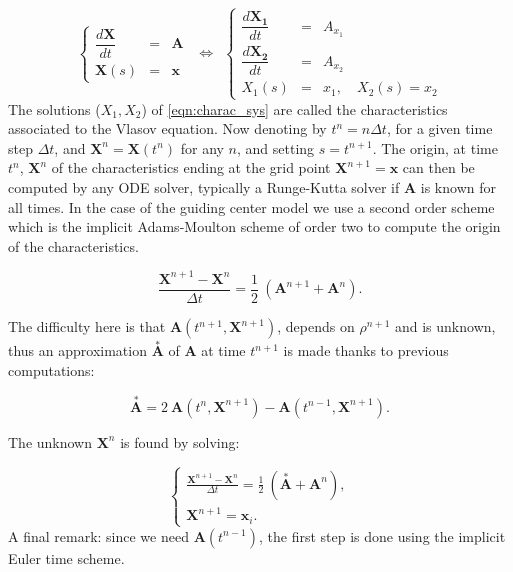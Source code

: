 \documentclass[proc]{edpsmath}
\begin{document}
\begin{equation}
	\label{eqn:charac_sys}
	\left\lbrace
	\begin{array}{lcl}
	\displaystyle \dfrac{d \mathbf{X}}{dt} &=& \mathbf{A}\\[0.3cm]
	\displaystyle \mathbf{X}(s) &=& \mathbf{x}
	\end{array}\right.
~~\Longleftrightarrow ~~
	\left\lbrace
	\begin{array}{lcl}
	\displaystyle \dfrac{d \mathbf{X_1}}{dt} &=& A_{x_1}\\[0.3cm]
	\displaystyle \dfrac{d \mathbf{X_2}}{dt} &=& A_{x_2}\\[0.3cm]
	\displaystyle X_1(s) &=& x_1, \quad   X_2(s) = x_2
	\end{array}\right.
\end{equation}
The solutions ($X_1, X_2$) of \eqref{eqn:charac_sys} are called the characteristics associated to the Vlasov equation. 
Now denoting by $t^n=n\Delta t$, for a given time step $\Delta t$, and $\mathbf{X}^n= \mathbf{X}(t^n)$ for any $n$, and setting $s=t^{n+1}$. The origin, at time $t^n$, $ \mathbf{X}^n$ of the characteristics ending at the grid point $ \mathbf{X}^{n+1}= \mathbf{x}$ can then be computed by any ODE solver, typically a Runge-Kutta solver if  $ \mathbf{A}$ is known for all times. In the case of the guiding  center model we use a second order scheme which is the implicit Adams-Moulton scheme of order two to compute the origin of the characteristics.

 \begin{equation*}
 	 \displaystyle{ \frac{\textbf{X}^{n+1}-\textbf{X}^{n}}{ \Delta t } =\frac{1}{2} ~( \textbf{A}^{n+1}+\textbf{A}^{n} ) }.
 \end{equation*} 
 
\noindent The difficulty here is that  $\textbf{A}(t^{n+1},\textbf{X}^{n+1})$, depends on $\rho^{n+1}$ and is unknown, thus an approximation $\overset{*}{\textbf{A}}$ of    $\textbf{A}$ at time $t^{n+1}$ is made thanks to previous computations:
 
 \begin{equation*}
\overset{*}{\textbf{A}}= 2~\textbf{A}(t^{n},\textbf{X}^{n+1}) -  \textbf{A}(t^{n-1},\textbf{X}^{n+1}).
 \end{equation*} 
 
\noindent The unknown $\textbf{X}^{n}$ is found by solving:
 
 
 \begin{equation*}
 	\begin{cases}
 	 \displaystyle{ \frac{\textbf{X}^{n+1}-\textbf{X}^{n}}{ \Delta t } =\frac{1}{2} ~(\overset{*}{\textbf{A}}+\textbf{A}^{n} ) },\\[3.5mm]
 	 \textbf{X}^{n+1}=\textbf{x}_i .
 	\end{cases}
 \end{equation*} 
 A final remark: since we need $\textbf{A}(t^{n-1})$, the first step is done using the  implicit Euler time scheme. 
\end{document}
